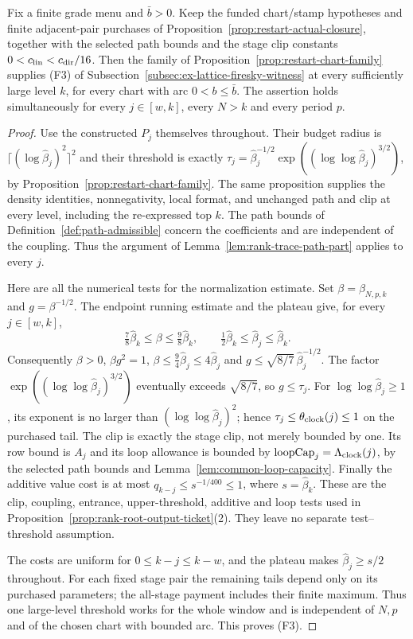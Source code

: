 \begin{corollary}
\label{cor:rank-trace-all-levels}
Fix a finite grade menu and $\bar b>0$. Keep the funded chart/stamp
hypotheses and finite adjacent-pair purchases of Proposition~\ref{prop:restart-actual-closure}, together
with the selected path bounds and the stage clip constants
$0<c_{\rm lin}<c_{\rm dir}/16$. Then the family of
Proposition~\ref{prop:restart-chart-family} supplies (F3) of
Subsection~\ref{subsec:ex-lattice-firesky-witness} at every sufficiently
large level $k$, for every chart with arc $0<b\le\bar b$.
The assertion holds simultaneously for every
$j\in[w,k]$, every $N>k$ and every period $p$.
\end{corollary}
\begin{proof}
Use the constructed $P_j$ themselves throughout. Their budget radius is
$\lceil(\log\widehat\beta_j)^2\rceil^2$ and their threshold is exactly
$\tau_j=\widehat\beta_j^{-1/2}
\exp((\log\log\widehat\beta_j)^{3/2})$, by
Proposition~\ref{prop:restart-chart-family}. The same proposition supplies
the density identities, nonnegativity, local format, and unchanged
path and clip at every level, including the re-expressed top $k$.
The path bounds of Definition~\ref{def:path-admissible} concern the
coefficients and are independent of the coupling. Thus the argument of
Lemma~\ref{lem:rank-trace-path-part} applies to every $j$.

Here are all the numerical tests for the normalization estimate.
Set $\beta=\beta_{N,p,k}$ and $g=\beta^{-1/2}$. The endpoint running
estimate and the plateau give, for every $j\in[w,k]$,
\[
 \tfrac78\widehat\beta_k\le\beta\le\tfrac98\widehat\beta_k,
 \qquad \tfrac12\widehat\beta_k\le\widehat\beta_j
                        \le\widehat\beta_k.
\]
Consequently $\beta>0$, $\beta g^2=1$,
$\beta\le\tfrac94\widehat\beta_j\le4\widehat\beta_j$ and
$g\le\sqrt{8/7}\,\widehat\beta_j^{-1/2}$. The factor
$\exp((\log\log\widehat\beta_j)^{3/2})$ eventually exceeds
$\sqrt{8/7}$, so $g\le\tau_j$.
For $\log\log\widehat\beta_j\ge1$, its exponent is no larger than
$(\log\log\widehat\beta_j)^2$; hence
$\tau_j\le\theta_{\rm clock}(j)\le1$ on the purchased tail.
The clip is exactly the stage clip, not merely bounded by one.
Its row bound is $A_j$ and its loop allowance is bounded by
$\mathrm{loopCap}_j=\Lambda_{\rm clock}(j)$, by the selected path
bounds and Lemma~\ref{lem:common-loop-capacity}.
Finally the additive value cost is at most
$q_{k-j}\le s^{-1/400}\le1$, where $s=\widehat\beta_k$.
These are the clip, coupling, entrance, upper-threshold, additive and
loop tests used in Proposition~\ref{prop:rank-root-output-ticket}(2).
They leave no separate test--threshold assumption.

The costs are uniform for $0\le k-j\le k-w$, and the plateau makes
$\widehat\beta_j\ge s/2$ throughout. For each fixed stage pair the
remaining tails depend only on its purchased parameters; the all-stage
payment includes their finite maximum. Thus one large-level threshold
works for the whole window and is independent of $N,p$ and of the
chosen chart with bounded arc. This proves (F3).
\end{proof}

